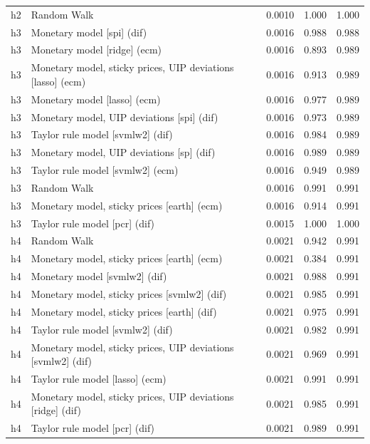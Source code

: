 \begin{ThreePartTable}
\begin{longtable}[t]{cp{5.5cm}ccc}
h2 & \raggedright Random Walk & 0.0010 & 1.000 & 1.000\\
\addlinespace
h3 & \raggedright Monetary model [spi] (dif) & 0.0016 & 0.988 & 0.988\\
h3 & \raggedright Monetary model [ridge] (ecm) & 0.0016 & 0.893 & 0.989\\
h3 & \raggedright Monetary model, sticky prices, UIP deviations [lasso] (ecm) & 0.0016 & 0.913 & 0.989\\
h3 & \raggedright Monetary model [lasso] (ecm) & 0.0016 & 0.977 & 0.989\\
h3 & \raggedright Monetary model, UIP deviations [spi] (dif) & 0.0016 & 0.973 & 0.989\\
h3 & \raggedright Taylor rule model [svmlw2] (dif) & 0.0016 & 0.984 & 0.989\\
h3 & \raggedright Monetary model, UIP deviations [sp] (dif) & 0.0016 & 0.989 & 0.989\\
h3 & \raggedright Taylor rule model [svmlw2] (ecm) & 0.0016 & 0.949 & 0.989\\
h3 & \raggedright Random Walk & 0.0016 & 0.991 & 0.991\\
h3 & \raggedright Monetary model, sticky prices [earth] (ecm) & 0.0016 & 0.914 & 0.991\\
h3 & \raggedright Taylor rule model [pcr] (dif) & 0.0015 & 1.000 & 1.000\\
\addlinespace
h4 & \raggedright Random Walk & 0.0021 & 0.942 & 0.991\\
h4 & \raggedright Monetary model, sticky prices [earth] (ecm) & 0.0021 & 0.384 & 0.991\\
h4 & \raggedright Monetary model [svmlw2] (dif) & 0.0021 & 0.988 & 0.991\\
h4 & \raggedright Monetary model, sticky prices [svmlw2] (dif) & 0.0021 & 0.985 & 0.991\\
h4 & \raggedright Monetary model, sticky prices [earth] (dif) & 0.0021 & 0.975 & 0.991\\
h4 & \raggedright Taylor rule model [svmlw2] (dif) & 0.0021 & 0.982 & 0.991\\
h4 & \raggedright Monetary model, sticky prices, UIP deviations [svmlw2] (dif) & 0.0021 & 0.969 & 0.991\\
h4 & \raggedright Taylor rule model [lasso] (ecm) & 0.0021 & 0.991 & 0.991\\
h4 & \raggedright Monetary model, sticky prices, UIP deviations [ridge] (dif) & 0.0021 & 0.985 & 0.991\\
h4 & \raggedright Taylor rule model [pcr] (dif) & 0.0021 & 0.989 & 0.991\\

\end{longtable}
\end{ThreePartTable}
